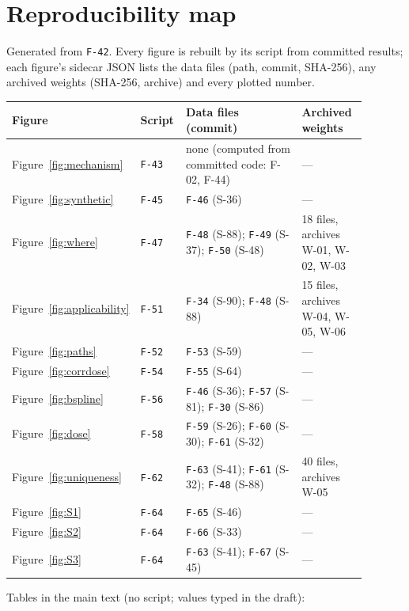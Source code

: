 \section{Reproducibility map}\label{app:repro}

Generated from \texttt{F-42}. Every figure is rebuilt by its script from committed results; each figure's sidecar JSON lists the data files (path, commit, SHA-256), any archived weights (SHA-256, archive) and every plotted number. \REPOSTATEMENT

{\footnotesize\setlength{\tabcolsep}{3pt}
\begin{longtable}{R{0.15\linewidth} R{0.13\linewidth} R{0.42\linewidth} R{0.19\linewidth}}
\toprule
Figure & Script & Data files (commit) & Archived weights \\
\midrule
\endhead
Figure~\ref{fig:mechanism}  & \texttt{F-43} & none (computed from committed code: F-02, F-44) & --- \\
Figure~\ref{fig:synthetic}  & \texttt{F-45} & \texttt{F-46} (S-36) & --- \\
Figure~\ref{fig:where}  & \texttt{F-47} & \texttt{F-48} (S-88); \texttt{F-49} (S-37); \texttt{F-50} (S-48) & 18 files, archives W-01, W-02, W-03 \\
Figure~\ref{fig:applicability}  & \texttt{F-51} & \texttt{F-34} (S-90); \texttt{F-48} (S-88) & 15 files, archives W-04, W-05, W-06 \\
Figure~\ref{fig:paths}  & \texttt{F-52} & \texttt{F-53} (S-59) & --- \\
Figure~\ref{fig:corrdose}  & \texttt{F-54} & \texttt{F-55} (S-64) & --- \\
Figure~\ref{fig:bspline}  & \texttt{F-56} & \texttt{F-46} (S-36); \texttt{F-57} (S-81); \texttt{F-30} (S-86) & --- \\
Figure~\ref{fig:dose}  & \texttt{F-58} & \texttt{F-59} (S-26); \texttt{F-60} (S-30); \texttt{F-61} (S-32) & --- \\
Figure~\ref{fig:uniqueness}  & \texttt{F-62} & \texttt{F-63} (S-41); \texttt{F-61} (S-32); \texttt{F-48} (S-88) & 40 files, archives W-05 \\
Figure~\ref{fig:S1}  & \texttt{F-64} & \texttt{F-65} (S-46) & --- \\
Figure~\ref{fig:S2}  & \texttt{F-64} & \texttt{F-66} (S-33) & --- \\
Figure~\ref{fig:S3}  & \texttt{F-64} & \texttt{F-63} (S-41); \texttt{F-67} (S-45) & --- \\
\bottomrule
\end{longtable}}
\noindent Tables in the main text (no script; values typed in the draft):


